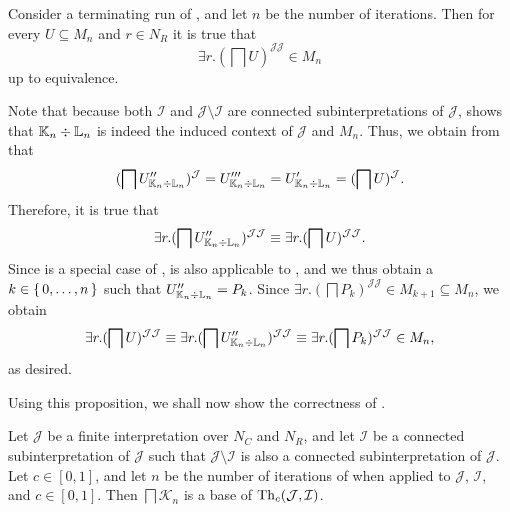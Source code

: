 \begin{Proposition}
  \label{prop:Felix-6.7-adapted}
  Consider a terminating run of , and let
  $n$ be the number of iterations.  Then for every $U \subseteq M_{n}$ and $r \in N_{R}$
  it is true that
  \begin{equation*}
    \exists r.(\bigsqcap U)^{\mathcal{J}\mathcal{J}} \in M_{n}
  \end{equation*}
  up to equivalence.
\end{Proposition}
\begin{Proof}
  Note that because both $\mathcal{I}$ and $\mathcal{J} \setminus \mathcal{I}$ are
  connected subinterpretations of $\mathcal{J}$,  shows that ${\mathbb{K}}_{n} \div {\ensuremath{\mathbb{L}}}_{n}$ is indeed the induced context of $\mathcal{J}$ and $M_{n}$.
  Thus, we obtain from  that
  \begin{equation*}
    (\bigsqcap U_{{\mathbb{K}}_{n} \div {\ensuremath{\mathbb{L}}}_{n}}'')^{\mathcal{J}} = U_{{\mathbb{K}}_{n} \div {\ensuremath{\mathbb{L}}}_{n}}''' = U_{{\mathbb{K}}_{n} \div {\ensuremath{\mathbb{L}}}_{n}}' = (\bigsqcap U)^{\mathcal{J}}.
  \end{equation*}
  Therefore, it is true that
  \begin{equation*}
    \exists r. (\bigsqcap U_{{\mathbb{K}}_{n} \div {\ensuremath{\mathbb{L}}}_{n}}'')^{\mathcal{J}\mathcal{J}}
    \equiv \exists r. (\bigsqcap U)^{\mathcal{J}\mathcal{J}}.
  \end{equation*}
  Since  is a special case of
  ,
   is also
  applicable to , and we thus obtain a $k
  \in {\ensuremath{\{\, 0, \dots, n \,\}}}$ such that $U_{{\mathbb{K}}_{n} \div {\ensuremath{\mathbb{L}}}_{n}}'' = P_{k}$.  Since
  $\exists r. (\bigsqcap P_{k})^{\mathcal{J}\mathcal{J}} \in M_{k+1} \subseteq M_{n}$, we obtain
  \begin{equation*}
    \exists r. (\bigsqcap U)^{\mathcal{J}\mathcal{J}} \equiv \exists r. (\bigsqcap U_{{\mathbb{K}}_{n} \div {\ensuremath{\mathbb{L}}}_{n}}'')^{\mathcal{J}\mathcal{J}} \equiv \exists r. (\bigsqcap
    P_{k})^{\mathcal{J}\mathcal{J}} \in M_{n},
  \end{equation*}
  as desired.
\end{Proof}

Using this proposition, we shall now show the correctness of
.

\begin{Theorem}
  \label{thm:confident-base-gcis-trusted-objects-is-correct}
  Let $\mathcal{J}$ be a finite interpretation over $N_{C}$ and $N_{R}$, and let
  $\mathcal{I}$ be a connected subinterpretation of $\mathcal{J}$ such that $\mathcal{J}
  \setminus \mathcal{I}$ is also a connected subinterpretation of $\mathcal{J}$.  Let $c
  \in [0,1]$, and let $n$ be the number of iterations of
   when applied to $\mathcal{J}$,
  $\mathcal{I}$, and $c \in [0,1]$.  Then $\bigsqcap \mathcal{K}_{n}$ is a base of
  $\operatorname{Th}_{c}(\mathcal{J}, \mathcal{I})$.
\end{Theorem}

